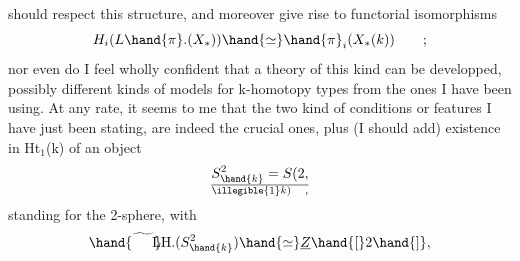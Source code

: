 should respect this structure,  and moreover give rise to functorial
isomorphisms
\[ H_i(L\hand{\pi}.(X_*)) \hand{\simeq} \hand{\pi}_i(X_*(k)) \qquad ; \]
nor even do I feel wholly confident that a theory of this kind can be
developped,   possibly different kinds of models for k-homotopy
types from the ones I have been using.  At any rate,  it seems to me 
that the two kind of conditions or features I have just been stating,
are indeed the crucial ones,  plus (I should add)  existence in Ht$_1$(k)
of an object 
\[ S^2_{\hand{k}} = S(2,\over{\illegible{1}}{k}) \quad , \]
standing for the  2-sphere,  with
\[ \hand{\widetilde{\phantom{LH}}}\!\!\!\!\mathrm{LH}.(S^2_{\hand{k}}) \hand{\simeq} \underline{Z}\hand{[}2\hand{]} , \]


